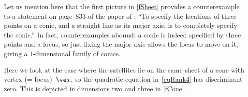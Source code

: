 \documentclass[reqno]{amsart}
\begin{document}
\begin{ex}
  Let us mention here that the first picture in \cref{fSheet}
  provides a counterexample to a statement on page~833
  of the paper of : ``To specify the locations of three points on a conic,
  and a straight line as its major axis, is to completely specify the 
  conic.'' In fact, counterexamples abound: a conic is indeed specified by three points and a focus, so just fixing the major axis allows the focus to move on it, giving a $1$-dimensional family of conics.
\end{ex}

\begin{ex} \label{exCone}%
  Here we look at the case where the satellites lie on the same sheet of a cone with vertex (=
  focus)~$\ve x$, so the quadratic equation in~\eqref{eqRank4} has
  discriminant zero. This is depicted in dimensions two and three in
  \cref{fCone}.
  

\end{ex}
\end{document}
